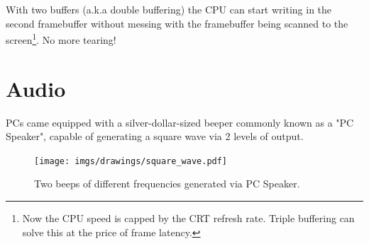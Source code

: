\documentclass[book.tex]{subfiles}
\begin{document}
\par
With two buffers (a.k.a double buffering) the CPU can start writing in the second framebuffer without messing with the framebuffer being scanned to the screen\footnote{Now the CPU speed is capped by the CRT refresh rate. Triple buffering can solve this at the price of frame latency.}. No more tearing!
















\section{Audio}
\label{hardware-audio}
PCs came equipped with a silver-dollar-sized beeper commonly known as a "PC Speaker", capable of generating a square wave via 2 levels of output.\\
\begin{figure}[H]

\centering

\end{figure}


\begin{figure}[H]

\centering
\texttt{[image: imgs/drawings/square\_wave.pdf]}
\caption{Two beeps of different frequencies generated via PC Speaker.}
\end{figure}
\end{document}
